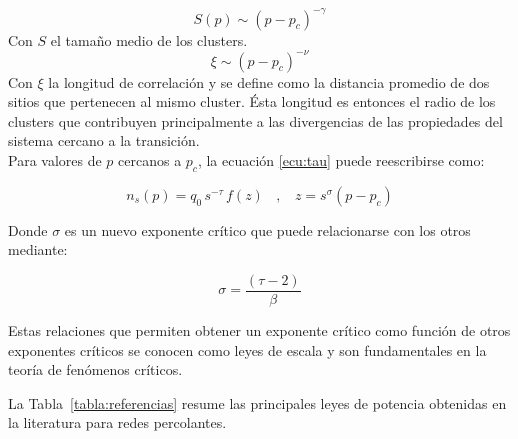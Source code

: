 \documentclass[%
 reprint,
 amsmath,amssymb,
 aps,
spanish]{revtex4-1}
\begin{document}
\begin{equation}
\label{ecu:gamma}
S(p)\sim (p-p_c)^{-\gamma}
\end{equation}
Con $S$ el tamaño medio de los clusters.\\

\begin{equation}
\label{ecu:nu}
\xi\sim (p-p_c)^{-\nu}
\end{equation}
Con $\xi$ la longitud de correlación y se define como la distancia promedio de dos sitios que pertenecen al mismo cluster. Ésta longitud es entonces el radio de los clusters que contribuyen principalmente a las divergencias de las propiedades del sistema cercano a la transición.\\

Para valores de $p$ cercanos a $p_c$, la ecuación \ref{ecu:tau} puede reescribirse como:

\begin{equation}
\label{ecu:tau2}
n_s(p)=q_0\,s^{-\tau}\,f(z)\ \ \ \ ,\ \ \ \ z=s^\sigma(p-p_c)
\end{equation} 

Donde $\sigma$ es un nuevo exponente crítico que puede relacionarse con los otros mediante:

\begin{equation}
\label{ecu:sigma}
\sigma = \frac{(\tau-2)}{\beta}
\end{equation} 

Estas relaciones que permiten obtener un exponente crítico como función de otros exponentes críticos se conocen como leyes de escala y son fundamentales en la teoría de fenómenos críticos.

La Tabla~\ref{tabla:referencias} resume las principales leyes de potencia obtenidas en la literatura para redes percolantes.\cite{levinshtein}\cite{stauffer}\cite{havlin}\cite{nakanishi}
\end{document}
